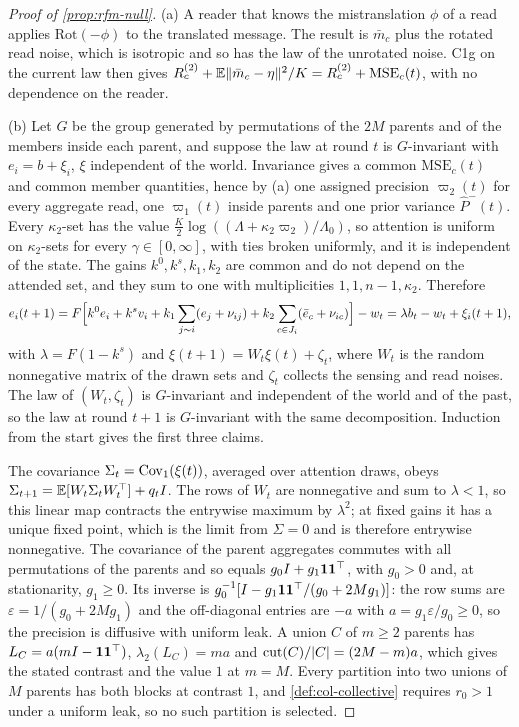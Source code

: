 \begin{proof}[Proof of \cref{prop:rfm-null}]
(a) A reader that knows the mistranslation $\phi$ of a read applies $\mathrm{Rot}(-\phi)$ to the translated message. The result is $\bar m_c$ plus the rotated read noise, which is isotropic and so has the law of the unrotated noise. C1g on the current law then gives $R_c^{(2)}+\mathbb{E}\|\bar m_c-\eta\|^2/K=R_c^{(2)}+\mathrm{MSE}_c(t)$, with no dependence on the reader.

(b) Let $G$ be the group generated by permutations of the $2M$ parents and of the members inside each parent, and suppose the law at round $t$ is $G$-invariant with $e_i=b+\xi_i$, $\xi$ independent of the world. Invariance gives a common $\mathrm{MSE}_c(t)$ and common member quantities, hence by (a) one assigned precision $\varpi_2(t)$ for every aggregate read, one $\varpi_1(t)$ inside parents and one prior variance $\hat P^-(t)$. Every $\kappa_2$-set has the value $\frac K2\log((\Lambda+\kappa_2\varpi_2)/\Lambda_0)$, so attention is uniform on $\kappa_2$-sets for every $\gamma\in[0,\infty]$, with ties broken uniformly, and it is independent of the state. The gains $k^0,k^s,k_1,k_2$ are common and do not depend on the attended set, and they sum to one with multiplicities $1,1,n-1,\kappa_2$. Therefore
\begin{equation*}
e_i(t+1)=F\Bigl[k^0e_i+k^sv_i+k_1\sum_{j\sim i}(e_j+\nu_{ij})+k_2\sum_{c\in J_i}(\bar e_c+\nu_{ic})\Bigr]-w_t=\lambda b_t-w_t+\xi_i(t+1),
\end{equation*}
with $\lambda=F(1-k^s)$ and $\xi(t+1)=W_t\xi(t)+\zeta_t$, where $W_t$ is the random nonnegative matrix of the drawn sets and $\zeta_t$ collects the sensing and read noises. The law of $(W_t,\zeta_t)$ is $G$-invariant and independent of the world and of the past, so the law at round $t+1$ is $G$-invariant with the same decomposition. Induction from the start gives the first three claims.

The covariance $\Sigma_t=\operatorname{Cov}_1(\xi(t))$, averaged over attention draws, obeys $\Sigma_{t+1}=\mathbb{E}[W_t\Sigma_tW_t^\top]+q_tI$. The rows of $W_t$ are nonnegative and sum to $\lambda<1$, so this linear map contracts the entrywise maximum by $\lambda^2$; at fixed gains it has a unique fixed point, which is the limit from $\Sigma=0$ and is therefore entrywise nonnegative. The covariance of the parent aggregates commutes with all permutations of the parents and so equals $g_0I+g_1\mathbf{1}\mathbf{1}^\top$, with $g_0>0$ and, at stationarity, $g_1\ge0$. Its inverse is $g_0^{-1}[I-g_1\mathbf{1}\mathbf{1}^\top/(g_0+2Mg_1)]$: the row sums are $\varepsilon=1/(g_0+2Mg_1)$ and the off-diagonal entries are $-a$ with $a=g_1\varepsilon/g_0\ge0$, so the precision is diffusive with uniform leak. A union $C$ of $m\ge2$ parents has $L_C=a(mI-\mathbf{1}\mathbf{1}^\top)$, $\lambda_2(L_C)=ma$ and $\operatorname{cut}(C)/|C|=(2M-m)a$, which gives the stated contrast and the value $1$ at $m=M$. Every partition into two unions of $M$ parents has both blocks at contrast $1$, and \cref{def:col-collective} requires $r_0>1$ under a uniform leak, so no such partition is selected.


\end{proof}

